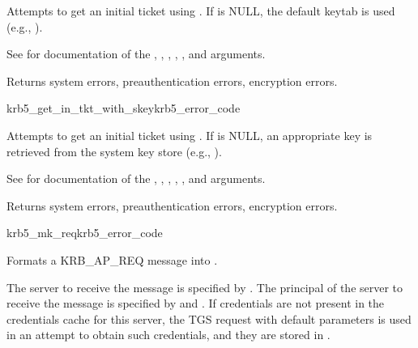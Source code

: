Attempts to get an initial ticket using .  If
 is NULL, the default keytab is used 
(e.g., ).

See  for documentation of the
, , ,
, ,  and
 arguments.

Returns system errors, preauthentication errors, encryption errors.

\begin{funcdecl}{krb5_get_in_tkt_with_skey}{krb5_error_code}{\funcinout}
\funcin
{}
\funcinout
{}
\end{funcdecl}

Attempts to get an initial ticket using .  If
 is NULL, an appropriate key is retrieved from the
system key store (e.g., ).

See  for documentation of the
, , ,
, ,  and
 arguments.

Returns system errors, preauthentication errors, encryption errors.

\begin{funcdecl}{krb5_mk_req}{krb5_error_code}{\funcinout}
\funcin
{}
\funcinout
{}
\funcout
{}
\end{funcdecl}

Formats a KRB_AP_REQ message into .

The server to receive the message is specified by
. The principal of the server to receive the message
is specified by  and .
If credentials are not present in the credentials cache
 for this server, the TGS request with default
parameters is used in an attempt to obtain such credentials, and they
are stored in .


